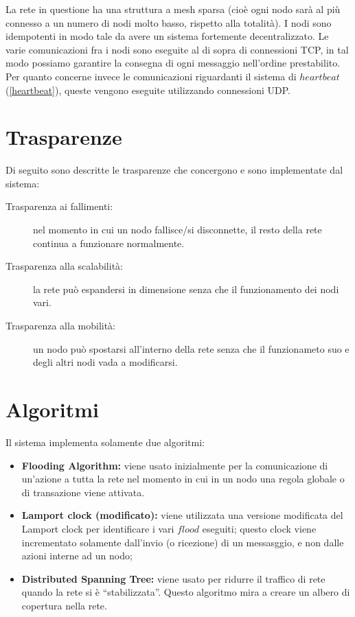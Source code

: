 \documentclass[italian]{memoir}
\begin{document}
La rete in questione ha una struttura a mesh sparsa (cioè ogni nodo sarà al più
	   connesso a un numero di nodi molto basso, rispetto alla totalità).
I nodi sono idempotenti in modo tale da avere un sistema fortemente decentralizzato.
Le varie comunicazioni fra i nodi sono eseguite al di sopra di connessioni TCP, in
	   tal modo possiamo garantire la consegna di ogni messaggio nell'ordine prestabilito.
Per quanto concerne invece le comunicazioni riguardanti il sistema di $heartbeat$
	   (\ref{heartbeat}), queste vengono eseguite utilizzando connessioni UDP.

\section{Trasparenze}\label{Trasparenze}

Di seguito sono descritte le trasparenze che concergono e sono implementate dal sistema:

\begin{description} 
\item[Trasparenza ai fallimenti:] nel momento in cui un nodo fallisce/si disconnette,
	   il resto della rete continua a funzionare normalmente.
\item[Trasparenza alla scalabilità:] la rete può espandersi in dimensione senza
	   che il funzionamento dei nodi vari.
\item[Trasparenza alla mobilità:] un nodo può spostarsi all'interno della rete
	   senza che il funzionameto suo e degli altri nodi vada a modificarsi.
\end{description}

\section{Algoritmi}

Il sistema implementa solamente due algoritmi:
\begin{itemize}
\item \textbf{Flooding Algorithm:} viene usato inizialmente per la comunicazione di un'azione
	   a tutta la rete nel momento in cui in un nodo una regola globale o di transazione viene attivata.
\item \textbf{Lamport clock (modificato):} viene utilizzata una versione modificata
	   del Lamport clock per identificare i vari $flood$ eseguiti; questo clock viene
	   incrementato
	   solamente dall'invio (o ricezione) di un messasggio, e non dalle azioni interne
	   ad un nodo;
\item \textbf{Distributed Spanning Tree:} viene usato per ridurre il traffico di rete 
       quando la rete si è ``stabilizzata''. Questo algoritmo mira a creare un albero di
       copertura nella rete.
\end{itemize}
\end{document}
